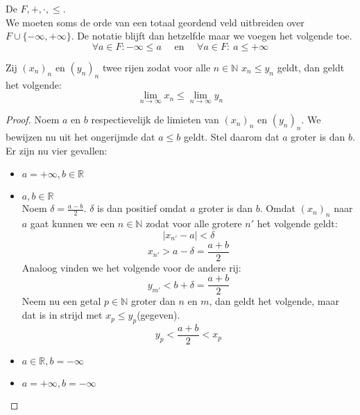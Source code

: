 \documentclass[main.tex]{subfiles}
\begin{document}
\begin{de}
  De  $F,+,\cdot,\le$.\\
  We moeten soms de orde van een totaal geordend veld uitbreiden over $F \cup \{ -\infty,+\infty\}$.
  De notatie blijft dan hetzelfde maar we voegen het volgende toe.
  \[ \forall a\in F: -\infty \le a \quad\text{ en }\quad \forall a \in F:\ a \le +\infty \]
\end{de}

\begin{bpr}
  \label{pr:limiet-behoudt-orde}
  Zij $(x_{n})_{n}$ en $(y_{n})_{n}$ twee rijen zodat voor alle $n\in \mathbb{N}$ $x_{n}\le y_{n}$ geldt, dan geldt het volgende:
  \[ \lim_{n\rightarrow \infty}x_{n} \le \lim_{n\rightarrow \infty}y_{n} \]

  \begin{proof}
    Noem $a$ en $b$ respectievelijk de limieten van $(x_{n})_{n}$ en $(y_{n})_{n}$.
    We bewijzen nu uit het ongerijmde dat $a \le b$ geldt.
    Stel daarom dat $a$ groter is dan $b$.
    Er zijn nu vier gevallen:
    \begin{itemize}
    \item $a = +\infty, b \in \mathbb{R}$\\
    \item $a,b\in \mathbb{R}$\\
      Noem $\delta = \frac{a-b}{2}$.
      $\delta$ is dan positief omdat $a$ groter is dan $b$.
      Omdat $(x_{n})_{n}$ naar $a$ gaat kunnen we een $n\in \mathbb{N}$ zodat voor alle grotere $n'$ het volgende geldt:
      \[ |x_{n'}-a|<\delta \]
      \[ x_{n'} > a - \delta = \frac{a+b}{2} \]
      Analoog vinden we het volgende voor de andere rij:
      \[ y_{m'} < b+\delta = \frac{a+b}{2} \]
      Neem nu een getal $p\in \mathbb{N}$ groter dan $n$ en $m$, dan geldt het volgende, maar dat is in strijd met $x_{p} \le y_{p}$(gegeven).
      \[ y_{p} < \frac{a+b}{2} < x_{p} \]
    \item $a\in \mathbb{R}, b = -\infty$\\
    \item $a= +\infty, b=-\infty$\\
    \end{itemize}
  \end{proof}
\end{bpr}
\end{document}

